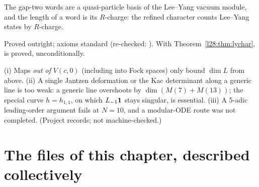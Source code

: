 \begin{physics}
The gap-two words are a quasi-particle basis of the Lee--Yang vacuum module, and the length of a word is its $R$-charge: the refined
character counts Lee--Yang states by $R$-charge.
\end{physics}

\begin{status}
Proved outright; axioms standard (re-checked: \allowbreak{}). With
Theorem~\ref{l28:thm:lychar},  is proved, unconditionally.
\end{status}

\begin{warning}[title={Dead ends for the Lee--Yang character}]
(i) Maps \emph{out of} $V(c,0)$ (including into Fock spaces) only bound $\dim L$ from above. (ii) A single Jantzen deformation or the Kac determinant along a
generic line is too weak: a generic line overshoots by $\dim(M(7)+M(13))$; the special curve $h=h_{1,1}$, on which $L_{-1}\mathbf 1$ stays singular, is
essential. (iii) A 5-adic leading-order argument fails at $N=10$, and a modular-ODE route was not completed. (Project records; not machine-checked.)
\end{warning}


\section{The files of this chapter, described collectively}\label{l28:sec:infra}

